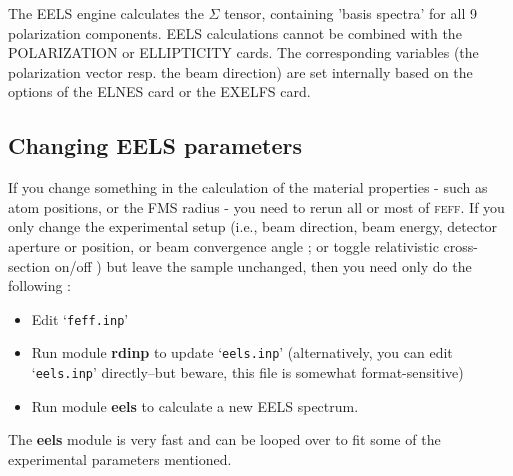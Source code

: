 \documentclass[11pt,oneside]{report} %
\renewcommand{\htmlref}[2]{\hyperlink{#2}{#1}}
\newcommand{\program}[1]{\textsc{#1}}
\newcommand{\feff}{\program{feff}}
\newcommand{\file}[1]{`\texttt{#1}'}
\newcommand{\module}[1]{\textrm{\bf{#1}}}
\renewcommand{\htmlref}[2]{{#1}} %
\begin{document}
  The EELS engine calculates the $\Sigma$ tensor, containing 'basis spectra' for 
all 9 polarization components.  EELS calculations cannot be combined with the \htmlref{POLARIZATION}{card:pol} or \htmlref{ELLIPTICITY}{card:ell} cards.  The
corresponding variables (the polarization vector resp. the beam direction) are set internally based on the options of the \htmlref{ELNES}{card:eln} card or the \htmlref{EXELFS}{card:exe} card.



\subsection{Changing EELS parameters}
\label{sec:EELS-changing}
If you change something in the calculation of the material properties - such as atom 
positions, or the FMS radius - you need to rerun all or most of {\feff}.
If you only change the experimental setup  (i.e., beam direction, beam energy, detector aperture or position, or beam convergence angle ; or toggle relativistic cross-section on/off ) but leave the sample unchanged, then you need only do the following :

\begin{itemize} \tightlist
  \item Edit \file{feff.inp}
  \item Run module \module{rdinp} to update \file{eels.inp} (alternatively, you can edit 
    \file{eels.inp} directly--but beware, this file is somewhat format-sensitive)
  \item Run module \module{eels} to calculate a new EELS spectrum.
\end{itemize}


 The \module{eels} module is very fast and can be looped over to fit some of the experimental parameters mentioned.

\end{document}
